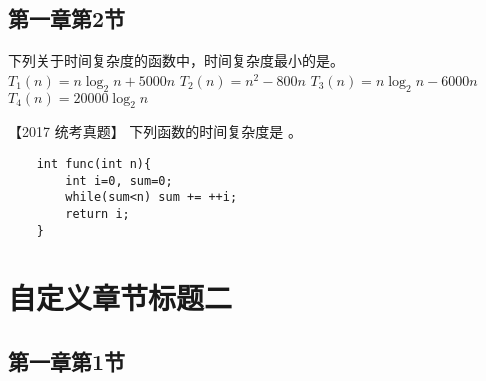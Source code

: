 \subsection{第一章第2节}
\begin{questions}[tr]
    \begin{bbox}
        \question   下列关于时间复杂度的函数中，时间复杂度最小的是\blankbox 。
        \fourchoices
        {$T_1(n)=n\log_2n +5000n$}
        {$T_2(n)=n^2 - 800n$}
        {$T_3(n)=n\log_2n - 6000n$}
        {$T_4(n)=20000\log_2n$}
    \end{bbox}

    \begin{bbox}
 
        \question   【2017 统考真题】 下列函数的时间复杂度是 \blankbox 。
        \begin{lstlisting}
    int func(int n){
        int i=0, sum=0;
        while(sum<n) sum += ++i;
        return i;
    }
        \end{lstlisting}
    \end{bbox}

\end{questions}

\section{自定义章节标题二}
\subsection{第一章第1节}

